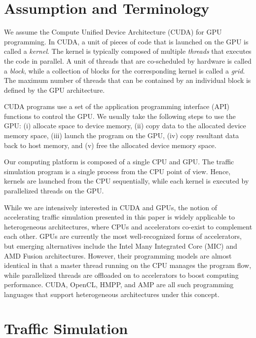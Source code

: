 \documentclass[times, 10pt, twocolumn]{article}
\begin{document}
\section{Assumption and Terminology}
\label{sec:assumption}

We assume the Compute Unified Device Architecture (CUDA) for GPU
programming.
In CUDA, a unit of pieces of code that is launched on the GPU is called
a \textit{kernel}.
The kernel is typically composed of multiple \textit{threads} that
executes the code in parallel.
A unit of threads that are co-scheduled by hardware is called a
\textit{block}, while a collection of blocks for the corresponding
kernel is called a \textit{grid}.  
The maximum number of threads that can be contained by an individual
block is defined by the GPU architecture.

CUDA programs use a set of the application programming interface (API)
functions to control the GPU.
We usually take the following steps to use the GPU: (i) allocate space
to device memory, (ii) copy data to the allocated device memory space,
(iii) launch the program on the GPU, (iv) copy resultant data back to
host memory, and (v) free the allocated device memory space. 

Our computing platform is composed of a single CPU and GPU.
The traffic simulation program is a single process from the CPU point of
view.
Hence, kernels are launched from the CPU sequentially, while each kernel
is executed by parallelized threads on the GPU.

While we are intensively interested in CUDA and GPUs, the notion of
accelerating traffic simulation presented in this paper is widely
applicable to heterogeneous architectures, where CPUs and 
accelerators co-exist to complement each other. 
GPUs are currently the most well-recognized forms of accelerators, but
emerging alternatives include the Intel Many Integrated Core (MIC) and
AMD Fusion architectures.
However, their programming models are almost identical in that a master
thread running on the CPU manages the program flow, while parallelized
threads are offloaded on to accelerators to boost computing performance.
CUDA, OpenCL, HMPP, and AMP are all such programming languages that
support heterogeneous architectures under this concept.

\section{Traffic Simulation}
\label{sec:traffic_simulation}
\end{document}
